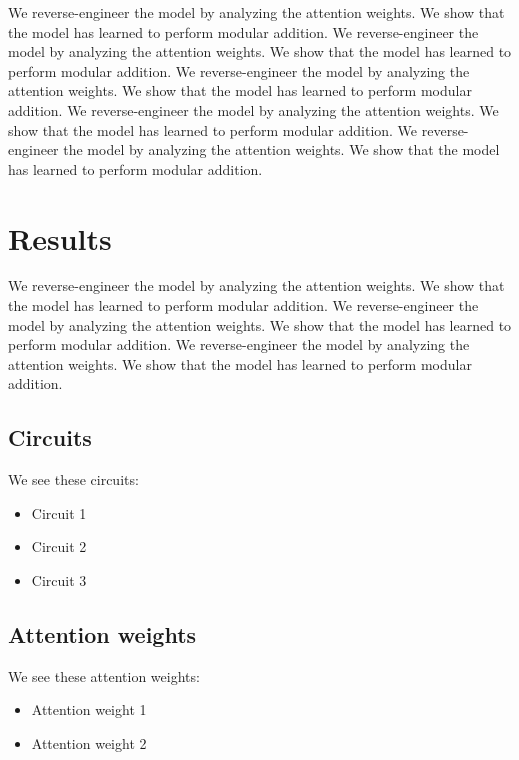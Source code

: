 \documentclass[11pt]{article} %
\begin{document}
\begin{multicols}{2}
  We reverse-engineer the model by analyzing the attention weights. We
  show that the model has learned to perform modular addition. We
  reverse-engineer the model by analyzing the attention weights. We show
  that the model has learned to perform modular addition. We
  reverse-engineer the model by analyzing the attention weights. We show
  that the model has learned to perform modular addition. We
  reverse-engineer the model by analyzing the attention weights. We show
  that the model has learned to perform modular addition. We
  reverse-engineer the model by analyzing the attention weights. We show
  that the model has learned to perform modular addition.


  \section{Results}\label{results}

  We reverse-engineer the model by analyzing the attention weights. We
  show that the model has learned to perform modular addition. We
  reverse-engineer the model by analyzing the attention weights. We show
  that the model has learned to perform modular addition. We
  reverse-engineer the model by analyzing the attention weights. We show
  that the model has learned to perform modular addition.

  \subsection{Circuits}\label{circuits}

  We see these circuits:

  \begin{itemize}
  \tightlist
  \item
    Circuit 1
  \item
    Circuit 2
  \item
    Circuit 3
  \end{itemize}

  \subsection{Attention weights}\label{attention-weights}

  We see these attention weights:

  \begin{itemize}
  \tightlist
  \item
    Attention weight 1
  \item
    Attention weight 2
  \end{itemize}


\end{multicols}
\end{document}
